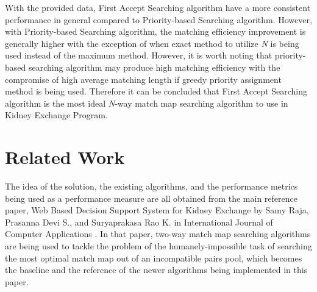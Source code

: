 \documentclass[conference]{IEEEtran}
\begin{document}
With the provided data, First Accept Searching algorithm have a more consistent performance in general compared to Priority-based Searching
algorithm. However, with Priority-based Searching algorithm, the matching efficiency improvement is generally higher with the exception of
when exact method to utilize \textit{N} is being used instead of the maximum method. However, it is worth noting that priority-based searching
algorithm may produce high matching efficiency with the compromise of high average matching length if greedy priority assignment method is being
used. Therefore it can be concluded that First Accept Searching algorithm is the most ideal \textit{N}-way match map searching algorithm to use
in Kidney Exchange Program. 

\section{Related Work}
The idea of the solution, the existing algorithms, and the performance metrics being used as a performance measure are all obtained from
the main reference paper, Web Based Decision Support System for Kidney Exchange by Samy Raja, Prasanna Devi S., and Suryaprakasa Rao K. in
International Journal of Computer Applications \cite{raja}. In that paper, two-way match map searching algorithms are being used to tackle
the problem of the humanely-impossible task of searching the most optimal match map out of an incompatible pairs pool, which becomes the baseline
and the reference of the newer algorithms being implemented in this paper.
\end{document}
